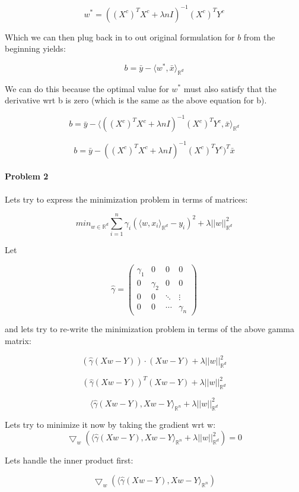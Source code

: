 \documentclass[12pt]{report}
\begin{document}
$$w^* = ((X^c)^TX^c + \lambda n I)^{-1}(X^c)^TY^c$$

Which we can then plug back in to out original formulation for $b$ from the beginning yields:

$$b= \bar{y} -\langle w^*, \bar{x} \rangle_{\mathbb{R}^d}$$

We can do this because the optimal value for $w^*$ must also satisfy that the derivative wrt b is zero (which is the same as the above equation for b).

$$b= \bar{y} -\langle ((X^c)^TX^c + \lambda n I)^{-1}(X^c)^TY^c, \bar{x} \rangle_{\mathbb{R}^d}$$

$$b= \bar{y} -((X^c)^TX^c + \lambda n I)^{-1}(X^c)^TY^c)^T \bar{x}$$

\paragraph{Problem 2}

Lets try to express the minimization problem in terms of matrices:

$$min_{w \in \mathbb{R}^d} \sum_{i=1}^{n} \gamma_i ( \langle w, x_i\rangle_{\mathbb{R}^d} - y_i)^2 + \lambda ||w||_{\mathbb{R}^d}^2$$

Let 

\[ \hat{\gamma} = \left( \begin{array}{cccc}
\gamma_1 & 0 & 0 & 0 \\
0 & \gamma_2 & 0 & 0 \\
0 & 0 & \ddots & \vdots \\
0 & 0 & \cdots & \gamma_n \end{array} \right)\] 

and lets try to re-write the minimization problem in terms of the above gamma matrix:

$$(\hat{\gamma} (Xw - Y)) \cdot (Xw - Y) + \lambda||w||_{\mathbb{R}^d}^2$$

$$(\hat{\gamma} (Xw - Y))^T (Xw - Y) + \lambda||w||_{\mathbb{R}^d}^2$$

$$\langle \hat{\gamma} (Xw - Y), Xw - Y\rangle_{\mathbb{R}^n} + \lambda||w||_{\mathbb{R}^d}^2$$

Lets try to minimize it now by taking the gradient wrt w:
$$ \bigtriangledown_w  \left( \langle \hat{\gamma} (Xw - Y), Xw - Y\rangle_{\mathbb{R}^n} + \lambda||w||_{\mathbb{R}^d}^2 \right) = 0$$

Lets handle the inner product first:

$$ \bigtriangledown_w  \left( \langle \hat{\gamma} (Xw - Y), Xw - Y\rangle_{\mathbb{R}^n} \right)$$
\end{document}
